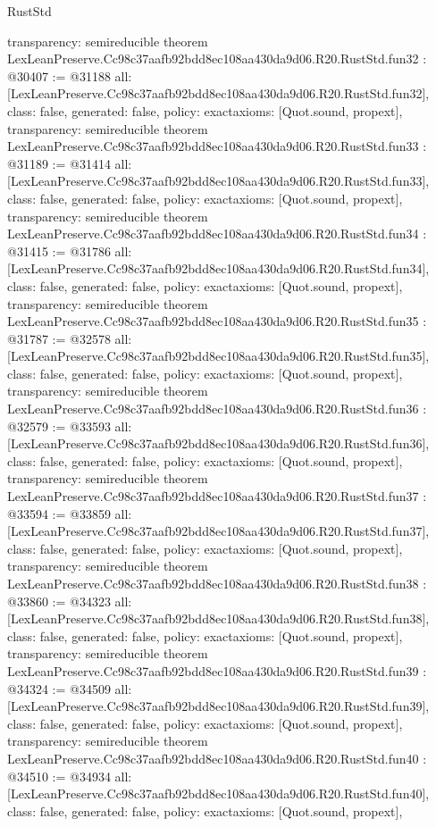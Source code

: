 \begin{lexlean}{RustStd}
\begin{coremodule}
{  transparency: semireducible
}
theorem LexLeanPreserve.Cc98c37aafb92bdd8ec108aa430da9d06.R20.RustStd.fun32 : @30407 := @31188 {
  all: [LexLeanPreserve.Cc98c37aafb92bdd8ec108aa430da9d06.R20.RustStd.fun32],
  class: false,
  generated: false,
  policy: exact{axioms: [Quot.sound, propext]},
  transparency: semireducible
}
theorem LexLeanPreserve.Cc98c37aafb92bdd8ec108aa430da9d06.R20.RustStd.fun33 : @31189 := @31414 {
  all: [LexLeanPreserve.Cc98c37aafb92bdd8ec108aa430da9d06.R20.RustStd.fun33],
  class: false,
  generated: false,
  policy: exact{axioms: [Quot.sound, propext]},
  transparency: semireducible
}
theorem LexLeanPreserve.Cc98c37aafb92bdd8ec108aa430da9d06.R20.RustStd.fun34 : @31415 := @31786 {
  all: [LexLeanPreserve.Cc98c37aafb92bdd8ec108aa430da9d06.R20.RustStd.fun34],
  class: false,
  generated: false,
  policy: exact{axioms: [Quot.sound, propext]},
  transparency: semireducible
}
theorem LexLeanPreserve.Cc98c37aafb92bdd8ec108aa430da9d06.R20.RustStd.fun35 : @31787 := @32578 {
  all: [LexLeanPreserve.Cc98c37aafb92bdd8ec108aa430da9d06.R20.RustStd.fun35],
  class: false,
  generated: false,
  policy: exact{axioms: [Quot.sound, propext]},
  transparency: semireducible
}
theorem LexLeanPreserve.Cc98c37aafb92bdd8ec108aa430da9d06.R20.RustStd.fun36 : @32579 := @33593 {
  all: [LexLeanPreserve.Cc98c37aafb92bdd8ec108aa430da9d06.R20.RustStd.fun36],
  class: false,
  generated: false,
  policy: exact{axioms: [Quot.sound, propext]},
  transparency: semireducible
}
theorem LexLeanPreserve.Cc98c37aafb92bdd8ec108aa430da9d06.R20.RustStd.fun37 : @33594 := @33859 {
  all: [LexLeanPreserve.Cc98c37aafb92bdd8ec108aa430da9d06.R20.RustStd.fun37],
  class: false,
  generated: false,
  policy: exact{axioms: [Quot.sound, propext]},
  transparency: semireducible
}
theorem LexLeanPreserve.Cc98c37aafb92bdd8ec108aa430da9d06.R20.RustStd.fun38 : @33860 := @34323 {
  all: [LexLeanPreserve.Cc98c37aafb92bdd8ec108aa430da9d06.R20.RustStd.fun38],
  class: false,
  generated: false,
  policy: exact{axioms: [Quot.sound, propext]},
  transparency: semireducible
}
theorem LexLeanPreserve.Cc98c37aafb92bdd8ec108aa430da9d06.R20.RustStd.fun39 : @34324 := @34509 {
  all: [LexLeanPreserve.Cc98c37aafb92bdd8ec108aa430da9d06.R20.RustStd.fun39],
  class: false,
  generated: false,
  policy: exact{axioms: [Quot.sound, propext]},
  transparency: semireducible
}
theorem LexLeanPreserve.Cc98c37aafb92bdd8ec108aa430da9d06.R20.RustStd.fun40 : @34510 := @34934 {
  all: [LexLeanPreserve.Cc98c37aafb92bdd8ec108aa430da9d06.R20.RustStd.fun40],
  class: false,
  generated: false,
  policy: exact{axioms: [Quot.sound, propext]},
}
\end{coremodule}
\end{lexlean}
